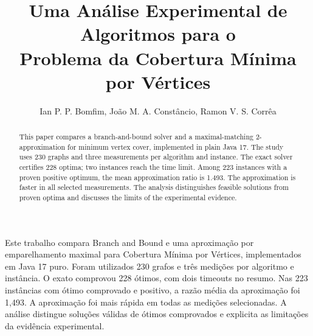 \documentclass[12pt]{article}
\title{Uma Análise Experimental de Algoritmos para o\\
Problema da Cobertura Mínima por Vértices}
\author{Ian P. P. Bomfim\inst{1}, João M. A. Constâncio\inst{1}, Ramon V. S. Corrêa\inst{1}}
\begin{document}
\maketitle

\begin{otherlanguage}{english}
\begin{abstract}
This paper compares a branch-and-bound solver and a maximal-matching
2-approximation for minimum vertex cover, implemented in plain Java 17.
The study uses 230 graphs and three measurements per algorithm and instance.
The exact solver certifies 228 optima; two instances reach the time limit.
Among 223 instances with a proven positive optimum, the mean approximation
ratio is 1.493. The approximation is faster in all selected measurements.
The analysis distinguishes feasible solutions from proven optima and discusses
the limits of the experimental evidence.
\end{abstract}
\end{otherlanguage}

\begin{resumo}
Este trabalho compara Branch and Bound e uma aproximação por emparelhamento
maximal para Cobertura Mínima por Vértices, implementados em Java 17 puro.
Foram utilizados 230 grafos e três medições por algoritmo e instância.
O exato comprovou 228 ótimos, com dois timeouts no resumo.
Nas 223 instâncias com ótimo comprovado e positivo, a razão média da
aproximação foi 1,493. A aproximação foi mais rápida em todas as medições
selecionadas. A análise distingue soluções válidas de ótimos comprovados
e explicita as limitações da evidência experimental.
\end{resumo}








\FloatBarrier



\clearpage
\appendix


\end{document}
